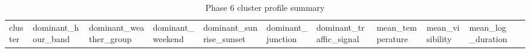\documentclass[
]{article}
\begin{document}
\begin{longtable}[]{@{}
  >{\raggedright\arraybackslash}p{}
  >{\raggedright\arraybackslash}p{}
  >{\raggedright\arraybackslash}p{}
  >{\raggedright\arraybackslash}p{}
  >{\raggedright\arraybackslash}p{}
  >{\raggedright\arraybackslash}p{}
  >{\raggedright\arraybackslash}p{}
  >{\raggedleft\arraybackslash}p{}
  >{\raggedleft\arraybackslash}p{}
  >{\raggedleft\arraybackslash}p{}
  >{\raggedright\arraybackslash}p{}@{}}
\caption{Phase 6 cluster profile summary}\tabularnewline
\toprule\noalign{}
\begin{minipage}[b]{\linewidth}\raggedright
cluster
\end{minipage} & \begin{minipage}[b]{\linewidth}\raggedright
dominant\_hour\_band
\end{minipage} & \begin{minipage}[b]{\linewidth}\raggedright
dominant\_weather\_group
\end{minipage} & \begin{minipage}[b]{\linewidth}\raggedright
dominant\_weekend
\end{minipage} & \begin{minipage}[b]{\linewidth}\raggedright
dominant\_sunrise\_sunset
\end{minipage} & \begin{minipage}[b]{\linewidth}\raggedright
dominant\_junction
\end{minipage} & \begin{minipage}[b]{\linewidth}\raggedright
dominant\_traffic\_signal
\end{minipage} & \begin{minipage}[b]{\linewidth}\raggedleft
mean\_temperature
\end{minipage} & \begin{minipage}[b]{\linewidth}\raggedleft
mean\_visibility
\end{minipage} & \begin{minipage}[b]{\linewidth}\raggedleft
mean\_log\_duration
\end{minipage} & \begin{minipage}[b]{\linewidth}\raggedright

\end{minipage}
\end{longtable}
\end{document}
